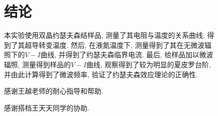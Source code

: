 \documentclass[font=default]{mpltx}
\newcommand{\note}[1]{{\color{gray}#1}}
\newcommand*\cs[1]{\texttt{\textbackslash #1}}
\newcommand*\env[1]{\textit{\texttt{#1}}}
\newcommand*\file[1]{\textbf{\texttt{#1}}}
\begin{document}
\begin{figure}[h]





\section{结论}
本实验使用双晶约瑟夫森结样品, 测量了其电阻与温度的关系曲线, 得到了其超导转变温度. 然后, 在液氮温度下, 测量得到了其在无微波辐照下的$V-I$曲线,
并得到了约瑟夫森临界电流. 最后, 给样品加以微波辐照, 测量得到样品的$V-I$曲线, 观察得到了较为明显的夏皮罗台阶, 并由此计算得到了微波频率, 验证了约瑟夫森效应理论的正确性.


\begin{acknowledgments}
  感谢王越老师的耐心指导和帮助.
  \par
  感谢搭档王天天同学的协助.
\end{acknowledgments}


\end{figure}
\end{document}
